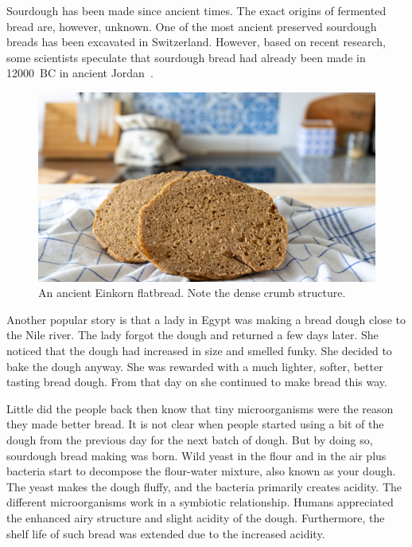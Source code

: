 Sourdough has been made since ancient times. The exact origins of fermented
bread are, however, unknown. One of the most ancient preserved
sourdough breads has been excavated in Switzerland.
However, based on recent research, some scientists speculate that sourdough
bread had already been made in \num{12000}~BC in ancient Jordan~\cite{jordan+bread}.

\begin{figure}[ht]
  \includegraphics[width=\textwidth]{einkorn-crumb}
  \caption{An ancient Einkorn flatbread. Note the dense crumb structure.}%
  \label{einkorn-crumb}
\end{figure}

Another popular story is that a lady in Egypt was making
a bread dough close to the Nile river. The lady forgot the
dough and returned a few days later. She noticed that the dough had
increased in size and smelled funky. She decided to bake
the dough anyway. She was rewarded with a much
lighter, softer, better tasting bread dough. From that day
on she continued to make bread this way.

Little did the people back then know that tiny microorganisms
were the reason they made better bread. It is not clear when
people started using a bit of the dough from the previous
day for the next batch of dough. But by doing so, sourdough
bread making was born. Wild yeast in the flour and in the air
plus bacteria start to decompose the flour-water mixture, also
known as your dough. The yeast makes the dough fluffy, and
the bacteria primarily creates acidity. The different
microorganisms work in a symbiotic relationship. Humans
appreciated the enhanced airy structure and slight acidity
of the dough. Furthermore, the shelf life of such bread
was extended due to the increased acidity. 

